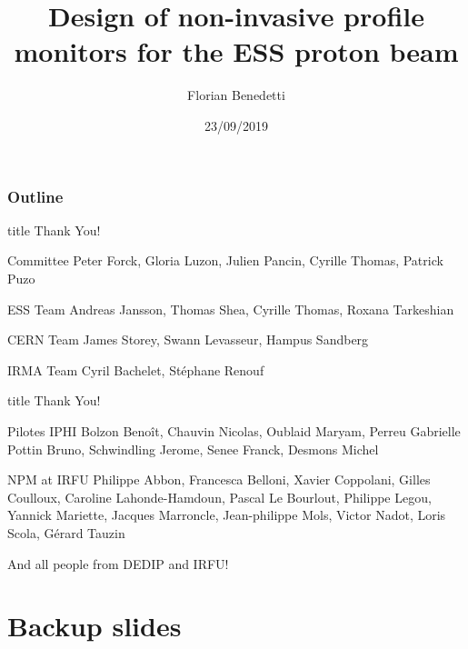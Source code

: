 \documentclass[9pt]{beamer}
\title{Design of non-invasive profile monitors for the ESS proton beam}
\author{Florian Benedetti}
\institute{CEA/IRFU}
\date{23/09/2019}
\newcommand{\backupbegin}{
   \newcounter{finalframe}
   \setcounter{finalframe}{\value{framenumber}}
}
\newcommand{\backupend}{
   \setcounter{framenumber}{\value{finalframe}}
}
\begin{document}
\frame{\titlepage}

\begin{frame}[t]
  \frametitle{Outline}
  \tableofcontents[subsectionstyle=hide/hide/hide]
\end{frame}







\begin{frame}[t]
  \centering
  \begin{beamercolorbox}[sep=8pt,center,shadow=true,rounded=true]{title}
    Thank You!\par%
  \end{beamercolorbox}
  \vfill

  \begin{block}{Committee}
    Peter Forck, Gloria Luzon, Julien Pancin, Cyrille Thomas, Patrick Puzo
  \end{block}
  \begin{block}{ESS Team}
    Andreas Jansson, Thomas Shea, Cyrille Thomas, Roxana Tarkeshian
  \end{block}
  \begin{block}{CERN Team}
    James Storey, Swann Levasseur, Hampus Sandberg
  \end{block}
  \begin{block}{IRMA Team}
    Cyril Bachelet, Stéphane Renouf
  \end{block}

\end{frame}

\begin{frame}[t]
  \centering
  \begin{beamercolorbox}[sep=8pt,center,shadow=true,rounded=true]{title}
    Thank You!\par%
  \end{beamercolorbox}
  \vfill

  \begin{block}{Pilotes IPHI}
    Bolzon Benoît, Chauvin Nicolas, Oublaid	Maryam, Perreu	Gabrielle Pottin	Bruno, Schwindling	Jerome, Senee	Franck, Desmons Michel
  \end{block}

  \begin{block}{NPM at IRFU}
  Philippe Abbon, Francesca Belloni, Xavier Coppolani, Gilles Coulloux, Caroline Lahonde-Hamdoun, Pascal Le Bourlout, Philippe Legou, Yannick Mariette, Jacques Marroncle, Jean-philippe Mols, Victor Nadot, Loris Scola, Gérard Tauzin
  \end{block}

  \centering
  And all people from DEDIP and IRFU!\par%

\end{frame}

\appendix
\section{Backup slides}
\backupbegin

\backupend
\end{document}
